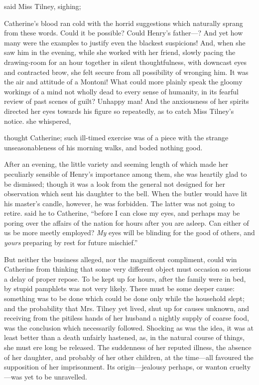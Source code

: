 
 said Miss Tilney, sighing; 

Catherine's blood ran cold with the horrid suggestions which naturally sprang from these words. Could it be possible? Could Henry's father---? And yet how many were the examples to justify even the blackest suspicions! And, when she saw him in the evening, while she worked with her friend, slowly pacing the drawing-room for an hour together in silent thoughtfulness, with downcast eyes and contracted brow, she felt secure from all possibility of wronging him. It was the air and attitude of a Montoni! What could more plainly speak the gloomy workings of a mind not wholly dead to every sense of humanity, in its fearful review of past scenes of guilt? Unhappy man! And the anxiousness of her spirits directed her eyes towards his figure so repeatedly, as to catch Miss Tilney's notice.  she whispered, 

 thought Catherine; such ill-timed exercise was of a piece with the strange unseasonableness of his morning walks, and boded nothing good.

After an evening, the little variety and seeming length of which made her peculiarly sensible of Henry's importance among them, she was heartily glad to be dismissed; though it was a look from the general not designed for her observation which sent his daughter to the bell. When the butler would have lit his master's candle, however, he was forbidden. The latter was not going to retire.  said he to Catherine, “before I can close my eyes, and perhaps may be poring over the affairs of the nation for hours after you are asleep. Can either of us be more meetly employed? {\em My} eyes will be blinding for the good of others, and {\em yours} preparing by rest for future mischief.”

But neither the business alleged, nor the magnificent compliment, could win Catherine from thinking that some very different object must occasion so serious a delay of proper repose. To be kept up for hours, after the family were in bed, by stupid pamphlets was not very likely. There must be some deeper cause: something was to be done which could be done only while the household slept; and the probability that Mrs. Tilney yet lived, shut up for causes unknown, and receiving from the pitiless hands of her husband a nightly supply of coarse food, was the conclusion which necessarily followed. Shocking as was the idea, it was at least better than a death unfairly hastened, as, in the natural course of things, she must ere long be released. The suddenness of her reputed illness, the absence of her daughter, and probably of her other children, at the time---all favoured the supposition of her imprisonment. Its origin---jealousy perhaps, or wanton cruelty---was yet to be unravelled.

